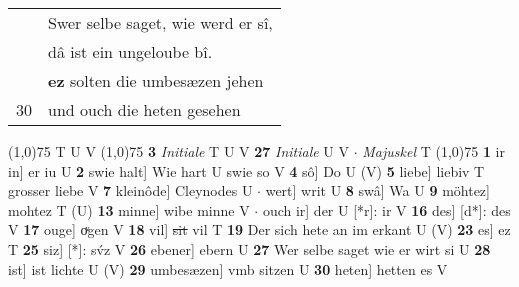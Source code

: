 \documentclass[8pt,a4paper,notitlepage]{article}
\begin{document}
\begin{table}[ht]
\begin{minipage}[t]{0.5\linewidth}
\begin{tabular}{rl}
 & Swer selbe saget, wie werd er sî,\\ 
 & dâ ist ein ungeloube bî.\\ 
 & \textbf{ez} solten die umbesæzen jehen\\ 
30 & und ouch die heten gesehen\\ 
\end{tabular}
\scriptsize
\line(1,0){75} \newline
T U V \newline
\line(1,0){75} \newline
\textbf{3} \textit{Initiale} T U V  \textbf{27} \textit{Initiale} U V   $\cdot$ \textit{Majuskel} T  \newline
\line(1,0){75} \newline
\textbf{1} ir in] er iu U \textbf{2} swie halt] Wie hart U swie so V \textbf{4} sô] Do U (V) \textbf{5} liebe] liebiv T grosser liebe V \textbf{7} kleinôde] Cleynodes U  $\cdot$ wert] writ U \textbf{8} swâ] Wa U \textbf{9} möhtez] mohtez T (U) \textbf{13} minne] wibe minne V  $\cdot$ ouch ir] der U [*r]: ir V \textbf{16} des] [d*]: des V \textbf{17} ouge] oͮgen V \textbf{18} vil] \sout{sit} vil T \textbf{19} Der sich hete an im erkant U (V) \textbf{23} es] ez T \textbf{25} siz] [*]: sv́z V \textbf{26} ebener] ebern U \textbf{27} Wer selbe saget wie er wirt si U \textbf{28} ist] ist lichte U (V) \textbf{29} umbesæzen] vmb sitzen U \textbf{30} heten] hetten es V \newline
\end{minipage}
\end{table}
\end{document}
